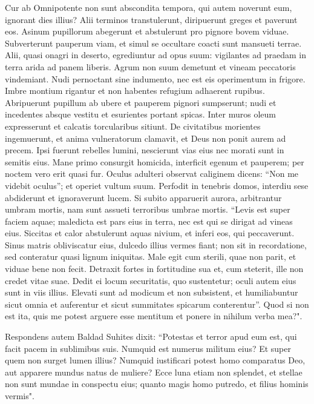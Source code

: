 \begin{biblechapter}  
\verse Cur ab Omnipotente non sunt abscondita tempora, qui autem noverunt eum, ignorant dies illius? 
\verse Alii terminos transtulerunt, diripuerunt greges et paverunt eos. 
\verse Asinum pupillorum abegerunt et abstulerunt pro pignore bovem viduae. 
\verse Subverterunt pauperum viam, et simul se occultare coacti sunt mansueti terrae. 
\verse Alii, quasi onagri in deserto, egrediuntur ad opus suum: vigilantes ad praedam in terra arida ad panem liberis. 
\verse Agrum non suum demetunt et vineam peccatoris vindemiant. 
\verse Nudi pernoctant sine indumento, nec est eis operimentum in frigore. 
\verse Imbre montium rigantur et non habentes refugium adhaerent rupibus. 
\verse Abripuerunt pupillum ab ubere et pauperem pignori sumpserunt; 
\verse nudi et incedentes absque vestitu et esurientes portant spicas. 
\verse Inter muros oleum expresserunt et calcatis torcularibus sitiunt. 
\verse De civitatibus morientes ingemuerunt, et anima vulneratorum clamavit, et Deus non ponit aurem ad precem. 
\verse Ipsi fuerunt rebelles lumini, nescierunt vias eius nec morati sunt in semitis eius. 
\verse Mane primo consurgit homicida, interficit egenum et pauperem; per noctem vero erit quasi fur. 
\verse Oculus adulteri observat caliginem dicens: “Non me videbit oculus”; et operiet vultum suum. 
\verse Perfodit in tenebris domos, interdiu sese abdiderunt et ignoraverunt lucem. 
\verse Si subito apparuerit aurora, arbitrantur umbram mortis, nam sunt assueti terroribus umbrae mortis. 
\verse “Levis est super faciem aquae; maledicta est pars eius in terra, nec est qui se dirigat ad vineas eius. 
\verse Siccitas et calor abstulerunt aquas nivium, et inferi eos, qui peccaverunt. 
\verse Sinus matris obliviscatur eius, dulcedo illius vermes fiant; non sit in recordatione, sed conteratur quasi lignum iniquitas. 
\verse Male egit cum sterili, quae non parit, et viduae bene non fecit. 
\verse Detraxit fortes in fortitudine sua et, cum steterit, ille non credet vitae suae. 
\verse Dedit ei locum securitatis, quo sustentetur; oculi autem eius sunt in viis illius. 
\verse Elevati sunt ad modicum et non subsistent, et humiliabuntur sicut omnia et auferentur et sicut summitates spicarum conterentur”. 
\verse Quod si non est ita, quis me potest arguere esse mentitum et ponere in nihilum verba mea?". 
\end{biblechapter}

\begin{biblechapter}  
\verse Respondens autem Baldad Suhites dixit: 
\verse “Potestas et terror apud eum est, qui facit pacem in sublimibus suis. 
\verse Numquid est numerus militum eius? Et super quem non surget lumen illius? 
\verse Numquid iustificari potest homo comparatus Deo, aut apparere mundus natus de muliere? 
\verse Ecce luna etiam non splendet, et stellae non sunt mundae in conspectu eius; 
\verse quanto magis homo putredo, et filius hominis vermis". 
\end{biblechapter}

